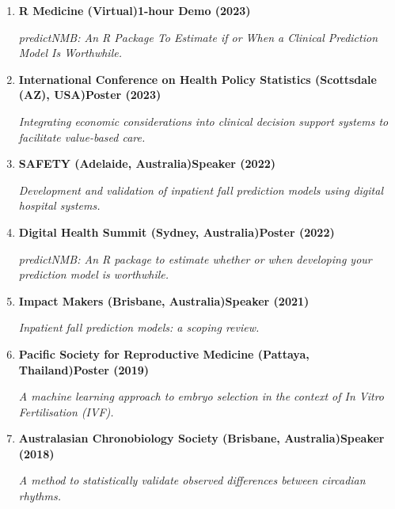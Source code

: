 \begin{enumerate}
	\item
		\textbf{R Medicine (Virtual)}\textbf{\hfill 1-hour Demo (2023)}\par 
		\textit{predictNMB: An R Package To Estimate if or When a Clinical Prediction Model Is Worthwhile.}
	\item
		\textbf{International Conference on Health Policy Statistics (Scottsdale (AZ), USA)}\textbf{\hfill Poster (2023)}\par 
		\textit{Integrating economic considerations into clinical decision support systems to facilitate value-based care.}
	\item
		\textbf{SAFETY (Adelaide, Australia)}\textbf{\hfill Speaker (2022)}\par 
		\textit{Development and validation of inpatient fall prediction models using digital hospital systems.}
	\item
		\textbf{Digital Health Summit (Sydney, Australia)}\textbf{\hfill Poster (2022)}\par 
		\textit{predictNMB: An R package to estimate whether or when developing your prediction model is worthwhile.}
	\item
		\textbf{Impact Makers (Brisbane, Australia)}\textbf{\hfill Speaker (2021)}\par 
		\textit{Inpatient fall prediction models: a scoping review.}
	\item
		\textbf{Pacific Society for Reproductive Medicine (Pattaya, Thailand)}\textbf{\hfill Poster (2019)}\par 
		\textit{A machine learning approach to embryo selection in the context of In Vitro Fertilisation (IVF).}
	\item
		\textbf{Australasian Chronobiology Society (Brisbane, Australia)}\textbf{\hfill Speaker (2018)}\par 
		\textit{A method to statistically validate observed differences between circadian rhythms.}
\end{enumerate}\par
